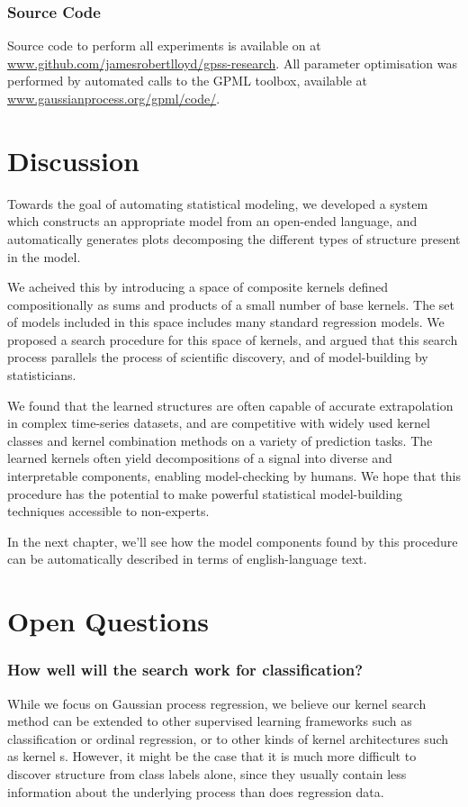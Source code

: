 \subsubsection{Source Code}
Source code to perform all experiments is available on at \url{www.github.com/jamesrobertlloyd/gpss-research}. 
All \gp{} parameter optimisation was performed by automated calls to the GPML toolbox, available at \url{www.gaussianprocess.org/gpml/code/}.


\section{Discussion}

Towards the goal of automating statistical modeling, we developed a system which constructs an appropriate model from an open-ended language, and automatically generates plots decomposing the different types of structure present in the model.

We acheived this by introducing a space of composite kernels defined compositionally as sums and products of a small number of base kernels.  
The set of models included in this space includes many standard regression models.
We proposed a search procedure for this space of kernels, and argued that this search process parallels the process of scientific discovery, and of model-building by statisticians.

We found that the learned structures are often capable of accurate extrapolation in complex time-series datasets, and are competitive with widely used kernel classes and kernel combination methods on a variety of prediction tasks.
The learned kernels often yield decompositions of a signal into diverse and interpretable components, enabling model-checking by humans.
We hope that this procedure has the potential to make powerful statistical model-building techniques accessible to non-experts.

In the next chapter, we'll see how the model components found by this procedure can be automatically described in terms of english-language text.


\section{Open Questions}

\subsubsection{How well will the search work for classification?}
While we focus on Gaussian process regression, we believe our kernel search method can be extended to other supervised learning frameworks such as classification or ordinal regression, or to other kinds of kernel architectures such as kernel \SVM{}s.
However, it might be the case that it is much more difficult to discover structure from class labels alone, since they usually contain less information about the underlying process than does regression data.

